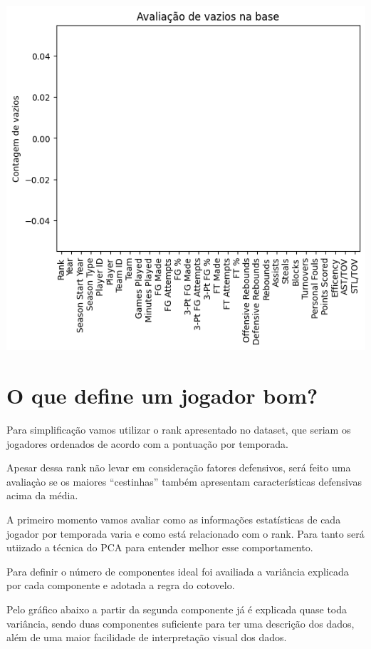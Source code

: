 \documentclass[
]{book}
\begin{document}
\includegraphics{imagens/2.png}

\hypertarget{o-que-define-um-jogador-bom}{%
\chapter{O que define um jogador bom?}\label{o-que-define-um-jogador-bom}}

Para simplificação vamos utilizar o rank apresentado no dataset, que seriam os jogadores ordenados de acordo com a pontuação por temporada.

Apesar dessa rank não levar em consideração fatores defensivos, será feito uma avaliaçào se os maiores ``cestinhas'' também apresentam características defensivas acima da média.

A primeiro momento vamos avaliar como as informações estatísticas de cada jogador por temporada varia e como está relacionado com o rank. Para tanto será utiizado a técnica do PCA para entender melhor esse comportamento.

Para definir o número de componentes ideal foi availiada a variância explicada por cada componente e adotada a regra do cotovelo.

Pelo gráfico abaixo a partir da segunda componente já é explicada quase toda variância, sendo duas componentes suficiente para ter uma descrição dos dados, além de uma maior facilidade de interpretação visual dos dados.
\end{document}
